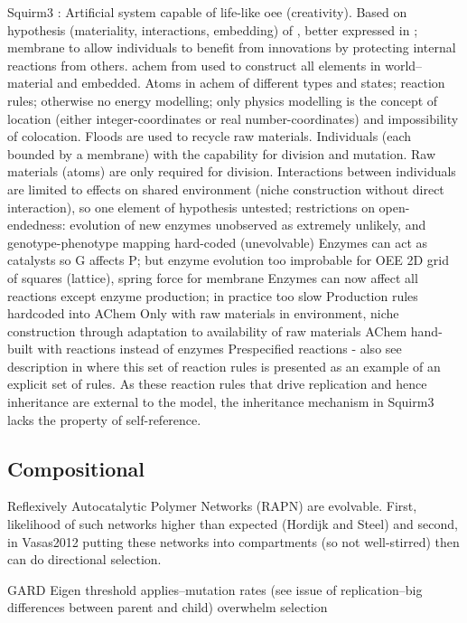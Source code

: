 Squirm3 \cite{Hutton2007,Hutton2002}:
Artificial system capable of life-like \gls{oee} (creativity).
Based on hypothesis (materiality, interactions, embedding) of \textcite{Taylor2001}, better expressed in \textcite[p.341]{Hutton2002}; membrane to allow individuals to benefit from innovations by protecting internal reactions from others.
\Gls{achem} from \textcite{Hutton2002} used to construct all elements in world--material and embedded.
Atoms in \gls{achem} of different types and states; reaction rules; otherwise no energy modelling; only physics modelling is the concept of location (either integer-coordinates or real number-coordinates) and impossibility of colocation. Floods are used to recycle raw materials.
Individuals (each bounded by a membrane) with the capability for division and mutation. Raw materials (atoms) are only required for division.
Interactions between individuals are limited to effects on shared environment (niche construction without direct interaction), so one element of hypothesis untested; restrictions on open-endedness: evolution of new enzymes unobserved as extremely unlikely, and genotype-phenotype mapping hard-coded (unevolvable)
Enzymes can act as catalysts so G affects P; but enzyme evolution too improbable for OEE
2D grid of squares (lattice), spring force for membrane
Enzymes can now affect all reactions except enzyme production; in practice too slow
Production rules hardcoded into AChem
Only with raw materials in environment, niche construction through adaptation to availability of raw materials
AChem hand-built with reactions instead of enzymes
Prespecified reactions \parencite[p.4]{Hutton2007}- also see description in \cite[p.49]{Faulconbridge2011} where this set of reaction rules is presented as an example of an explicit set of rules. As these reaction rules that drive replication and hence inheritance are external to the model, the inheritance mechanism in Squirm3 lacks the property of self-reference.

\subsection{Compositional}

\cite{Kauffman1986}
Reflexively Autocatalytic Polymer Networks (RAPN) are evolvable. First, likelihood of such networks higher than expected (Hordijk and Steel) and second, in Vasas2012 putting these networks into compartments (so not well-stirred) then can do directional selection.

GARD \parencite{Segre1998}
Eigen threshold applies--mutation rates (see issue of replication--big differences between parent and child) overwhelm selection \parencite{Vasas2015, Vasas2012, Vasas2012a}


